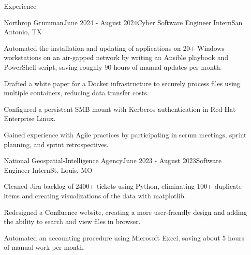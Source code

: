 \documentclass[
	10.5pt, %
]{resume} %
\begin{document}
\begin{rSection}{Experience}
	\begin{rSubsection2}{Northrop Grumman}{June 2024 - August 2024}{Cyber Software Engineer Intern}{San Antonio, TX}
		\item Automated the installation and updating of applications on 20+ Windows workstations on an air-gapped network by writing an Ansible playbook and PowerShell script, saving roughly 90 hours of manual updates per month.
		\item Drafted a white paper for a Docker infrastructure to securely process files using multiple containers, reducing data transfer costs.
		\item Configured a persistent SMB mount with Kerberos authentication in Red Hat Enterprise Linux.
		\item Gained experience with Agile practices by participating in scrum meetings, sprint planning, and sprint retrospectives.
    \end{rSubsection2}

	\begin{rSubsection2}{National Geospatial-Intelligence Agency}{June 2023 - August 2023}{Software Engineer Intern}{St. Louis, MO}
		\item Cleaned Jira backlog of 2400+ tickets using Python, eliminating 100+ duplicate items and creating visualizations of the data with matplotlib.
		\item Redesigned a Confluence website, creating a more user-friendly design and adding the ability to search and view files in browser.
		\item Automated an accounting procedure using Microsoft Excel, saving about 5 hours of manual work per month.
	\end{rSubsection2}

\end{rSection}

\end{document}
